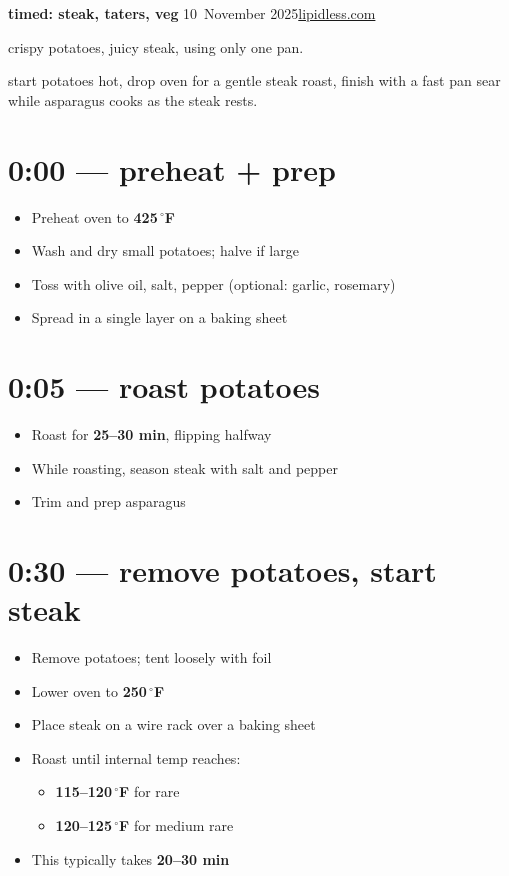 \documentclass[
    fontsize=10pt,DIV=16,
    letterpaper,oneside,paper=portrait
]{scrartcl}
\newcommand{\myname}{lipidless.com}
\newcommand{\mydate}{10~November 2025}
\newcommand{\mytitle}{timed: steak, taters, veg}
\newcommand{\myurl}{https://www.lipidless.com/recipes/timed-meal-steak-tater-veg}
\begin{document}
{\sffamily \textbf{\LARGE \mytitle} \hfill \mydate \hfill \href{\myurl}{\myname}}

\vspace{\baselineskip}

crispy potatoes, juicy steak, using only one pan.

start potatoes hot, drop oven for a gentle steak roast, finish with a fast pan sear while asparagus cooks as the steak rests.

\section{0:00 --- preheat + prep}
\begin{itemize}
  \item Preheat oven to \textbf{425\,$^\circ$F}
  \item Wash and dry small potatoes; halve if large
  \item Toss with olive oil, salt, pepper (optional: garlic, rosemary)
  \item Spread in a single layer on a baking sheet
\end{itemize}

\section{0:05 --- roast potatoes}
\begin{itemize}
  \item Roast for \textbf{25--30 min}, flipping halfway
  \item While roasting, season steak with salt and pepper
  \item Trim and prep asparagus
\end{itemize}

\section{0:30 --- remove potatoes, start steak}
\begin{itemize}
  \item Remove potatoes; tent loosely with foil
  \item Lower oven to \textbf{250\,$^\circ$F}
  \item Place steak on a wire rack over a baking sheet
  \item Roast until internal temp reaches:
  \begin{itemize}
    \item \textbf{115--120\,$^\circ$F} for rare
    \item \textbf{120--125\,$^\circ$F} for medium rare
  \end{itemize}
  \item This typically takes \textbf{20--30 min}
\end{itemize}
\end{document}
